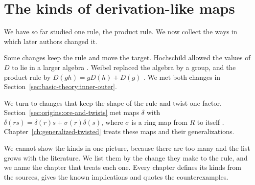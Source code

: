 \section{The kinds of derivation-like maps}\label{sec:basic-theory:family-tree}

We have so far studied one rule, the product rule. We now collect the ways in
which later authors changed it.

Some changes keep the rule and move the target. Hochschild allowed the values of
$D$ to lie in a larger algebra \cite[Definition~3.1, p.~688]{Hochschild1942}.
Weibel replaced the algebra by a group, and the product rule by
$D(gh) = gD(h) + D(g)$ \cite[Definition~6.4.1]{Weibel1994}. We met both changes
in Section~\ref{sec:basic-theory:inner-outer}.

We turn to changes that keep the shape of the rule and twist one factor.
Section~\ref{sec:origins:ore-and-twists} met maps $\delta$ with
$\delta(rs) = \delta(r)s + \sigma(r)\delta(s)$, where $\sigma$ is a ring map from
$R$ to itself \cite[p.~47]{BenkartLopesOndrus2015}. Chapter~\ref{ch:generalized-twisted}
treats these maps and their generalizations.

We cannot show the kinds in one picture, because there are too many and the list grows with the literature. We list them by the change they make to the rule, and we name the chapter that treats each one. Every chapter defines its kinds from the sources, gives the
known implications and quotes the counterexamples.

